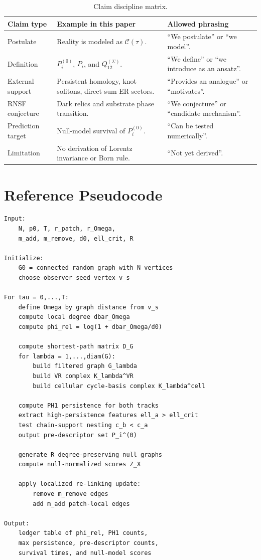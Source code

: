 \documentclass[11pt]{article}
\newcommand{\Ccal}{\mathcal{C}}
\newcommand{\Pre}{P_i^{(0)}}
\newcommand{\Pfull}{P_i}
\newcommand{\Qlink}{Q_{12}^{(\Sigma)}}
\begin{document}
\begin{table}[h]
\caption{Claim discipline matrix.}
\label{tab:claim-matrix}
\small
\begin{tabular}{p{}p{}p{}}
\toprule
\textbf{Claim type} & \textbf{Example in this paper} & \textbf{Allowed phrasing} \\
\midrule
Postulate & Reality is modeled as \(\Ccal(\tau)\). & ``We postulate'' or ``we model''. \\
Definition & \(\Pre\), \(\Pfull\), and \(\Qlink\). & ``We define'' or ``we introduce as an ansatz''. \\
External support & Persistent homology, knot solitons, direct-sum ER sectors. & ``Provides an analogue'' or ``motivates''. \\
RNSF conjecture & Dark relics and substrate phase transition. & ``We conjecture'' or ``candidate mechanism''. \\
Prediction target & Null-model survival of \(\Pre\). & ``Can be tested numerically''. \\
Limitation & No derivation of Lorentz invariance or Born rule. & ``Not yet derived''. \\
\bottomrule
\end{tabular}
\end{table}

\section{Reference Pseudocode}
\label{app:pseudocode}

\begin{lstlisting}
Input:
    N, p0, T, r_patch, r_Omega,
    m_add, m_remove, d0, ell_crit, R

Initialize:
    G0 = connected random graph with N vertices
    choose observer seed vertex v_s

For tau = 0,...,T:
    define Omega by graph distance from v_s
    compute local degree dbar_Omega
    compute phi_rel = log(1 + dbar_Omega/d0)

    compute shortest-path matrix D_G
    for lambda = 1,...,diam(G):
        build filtered graph G_lambda
        build VR complex K_lambda^VR
        build cellular cycle-basis complex K_lambda^cell

    compute PH1 persistence for both tracks
    extract high-persistence features ell_a > ell_crit
    test chain-support nesting c_b < c_a
    output pre-descriptor set P_i^(0)

    generate R degree-preserving null graphs
    compute null-normalized scores Z_X

    apply localized re-linking update:
        remove m_remove edges
        add m_add patch-local edges

Output:
    ledger table of phi_rel, PH1 counts,
    max persistence, pre-descriptor counts,
    survival times, and null-model scores
\end{lstlisting}
\end{document}
